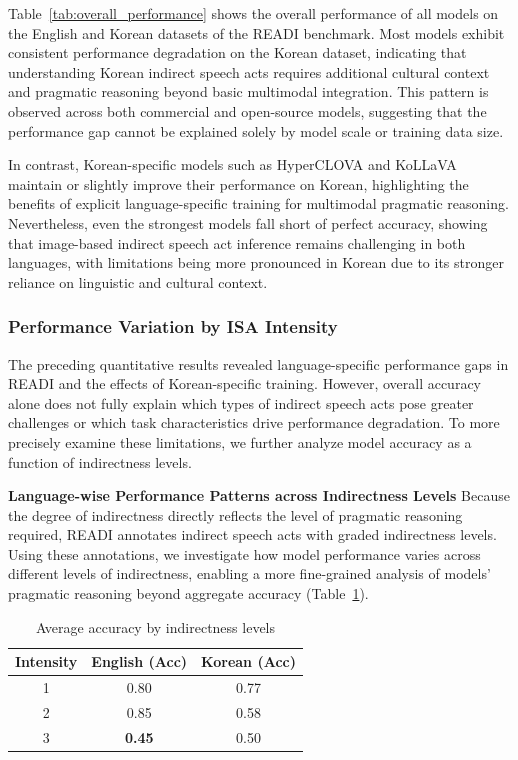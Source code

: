 \documentclass[11pt]{article}
\begin{document}
Table~\ref{tab:overall_performance} shows the overall performance of all models on the English and Korean datasets of the READI benchmark. Most models exhibit consistent performance degradation on the Korean dataset, indicating that understanding Korean indirect speech acts requires additional cultural context and pragmatic reasoning beyond basic multimodal integration. This pattern is observed across both commercial and open-source models, suggesting that the performance gap cannot be explained solely by model scale or training data size.

In contrast, Korean-specific models such as HyperCLOVA and KoLLaVA maintain or slightly improve their performance on Korean, highlighting the benefits of explicit language-specific training for multimodal pragmatic reasoning. Nevertheless, even the strongest models fall short of perfect accuracy, showing that image-based indirect speech act inference remains challenging in both languages, with limitations being more pronounced in Korean due to its stronger reliance on linguistic and cultural context.

\subsubsection{Performance Variation by ISA Intensity}
The preceding quantitative results revealed language-specific performance gaps in READI and the effects of Korean-specific training. However, overall accuracy alone does not fully explain which types of indirect speech acts pose greater challenges or which task characteristics drive performance degradation. To more precisely examine these limitations, we further analyze model accuracy as a function of indirectness levels.

\textbf{Language-wise Performance Patterns across Indirectness Levels} Because the degree of indirectness directly reflects the level of pragmatic reasoning required, READI annotates indirect speech acts with graded indirectness levels. Using these annotations, we investigate how model performance varies across different levels of indirectness, enabling a more fine-grained analysis of models’ pragmatic reasoning beyond aggregate accuracy (Table~\ref{tab:intensity_accuracy}).


\begin{table}[t]
\centering
\small
\renewcommand{\arraystretch}{0.9}  %
\setlength{\tabcolsep}{8pt}        %
\begin{tabular}{c cc}
\toprule
\textbf{Intensity} & \textbf{English (Acc)} & \textbf{Korean (Acc)} \\
\midrule
1 & 0.80 & 0.77 \\
2 & 0.85 & 0.58 \\
3 & \textbf{0.45} & 0.50 \\
\bottomrule
\end{tabular}
\caption{Average accuracy by indirectness levels}
\label{tab:intensity_accuracy}
\end{table}
\end{document}
